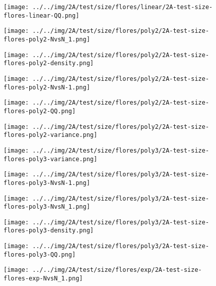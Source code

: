 \begin{figure}[H]
\centering	\texttt{[image: ../../img/2A/test/size/flores/linear/2A-test-size-flores-linear-QQ.png]}
\end{figure}
\begin{figure}[H]
\centering	\texttt{[image: ../../img/2A/test/size/flores/poly2/2A-test-size-flores-poly2-NvsN\_1.png]}
\end{figure}
\begin{figure}[H]
\centering	\texttt{[image: ../../img/2A/test/size/flores/poly2/2A-test-size-flores-poly2-density.png]}
\end{figure}
\begin{figure}[H]
\centering	\texttt{[image: ../../img/2A/test/size/flores/poly2/2A-test-size-flores-poly2-NvsN-1.png]}
\end{figure}
\begin{figure}[H]
\centering	\texttt{[image: ../../img/2A/test/size/flores/poly2/2A-test-size-flores-poly2-QQ.png]}
\end{figure}
\begin{figure}[H]
\centering	\texttt{[image: ../../img/2A/test/size/flores/poly2/2A-test-size-flores-poly2-variance.png]}
\end{figure}
\begin{figure}[H]
\centering	\texttt{[image: ../../img/2A/test/size/flores/poly3/2A-test-size-flores-poly3-variance.png]}
\end{figure}
\begin{figure}[H]
\centering	\texttt{[image: ../../img/2A/test/size/flores/poly3/2A-test-size-flores-poly3-NvsN-1.png]}
\end{figure}
\begin{figure}[H]
\centering	\texttt{[image: ../../img/2A/test/size/flores/poly3/2A-test-size-flores-poly3-NvsN\_1.png]}
\end{figure}
\begin{figure}[H]
\centering	\texttt{[image: ../../img/2A/test/size/flores/poly3/2A-test-size-flores-poly3-density.png]}
\end{figure}
\begin{figure}[H]
\centering	\texttt{[image: ../../img/2A/test/size/flores/poly3/2A-test-size-flores-poly3-QQ.png]}
\end{figure}
\begin{figure}[H]
\centering	\texttt{[image: ../../img/2A/test/size/flores/exp/2A-test-size-flores-exp-NvsN\_1.png]}
\end{figure}
